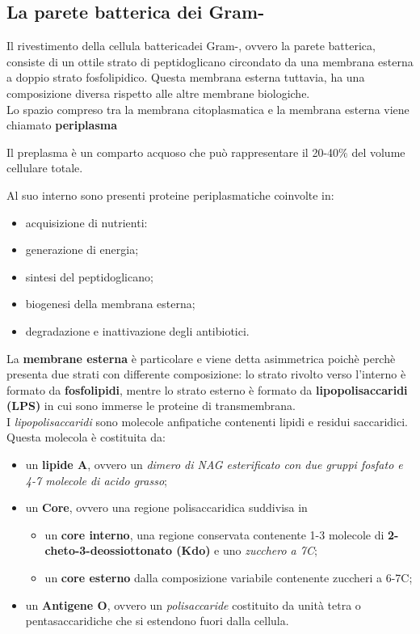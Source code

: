 \documentclass[11pt]{book}
\begin{document}
\subsection{La parete batterica dei Gram-}
Il rivestimento della cellula battericadei Gram-, ovvero la parete batterica, consiste di un ottile strato di peptidoglicano circondato da una membrana esterna a doppio strato fosfolipidico. Questa membrana esterna tuttavia, ha una composizione diversa rispetto alle altre membrane biologiche.\\
Lo spazio compreso tra la membrana citoplasmatica e la membrana esterna viene chiamato \textbf{periplasma}

\vspace{1em}
Il preplasma è un comparto acquoso che può rappresentare il 20-40$\%$ del volume cellulare totale.

Al suo interno sono presenti proteine periplasmatiche coinvolte in: 
\begin{itemize}
\item acquisizione di nutrienti:
\item generazione di energia;
\item sintesi del peptidoglicano;
\item biogenesi della membrana esterna;
\item degradazione e inattivazione degli antibiotici.
\end{itemize}

\clearpage
La \textbf{membrane esterna} è particolare e viene detta asimmetrica poichè perchè presenta due strati con differente composizione: lo strato rivolto verso l'interno è formato da \textbf{fosfolipidi}, mentre lo strato esterno è formato da \textbf{lipopolisaccaridi (LPS) }in cui sono immerse le proteine di transmembrana.\\

I \emph{lipopolisaccaridi} sono molecole anfipatiche contenenti lipidi e residui saccaridici.\\
Questa molecola è costituita da:
\begin{itemize}
\item un \textbf{lipide A}, ovvero un \emph{dimero di NAG esterificato con due gruppi fosfato e 4-7 molecole di acido grasso};
\item un \textbf{Core}, ovvero una regione polisaccaridica suddivisa in 
\begin{itemize}
\item un \textbf{core interno}, una regione conservata contenente 1-3 molecole di \textbf{2-cheto-3-deossiottonato (Kdo)} e uno \emph{zucchero a 7C};
\item un \textbf{core esterno} dalla composizione variabile contenente zuccheri a 6-7C; 
\end{itemize}
\item un \textbf{Antigene O}, ovvero un \emph{polisaccaride} costituito da unità tetra o pentasaccaridiche che si estendono fuori dalla cellula.
\end{itemize}
\end{document}
